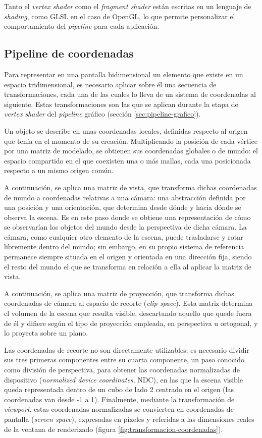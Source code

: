 Tanto el \emph{vertex shader} como el \emph{fragment shader} están escritas en un lenguaje de \emph{shading}, como GLSL en el caso de OpenGL, lo que permite personalizar el comportamiento del \textit{pipeline} para cada aplicación.

\subsection{Pipeline de coordenadas} \label{sec:pipeline-coordenadas}

Para representar en una pantalla bidimensional un elemento que existe en un espacio tridimensional, es necesario aplicar sobre él una secuencia de transformaciones, cada una de las cuales lo lleva de un sistema de coordenadas al siguiente. Estas transformaciones son las que se aplican durante la etapa de \emph{vertex shader} del \textit{pipeline} gráfico (sección \ref{sec:pipeline-grafico}).

Un objeto se describe en unas coordenadas locales, definidas respecto al origen que tenía en el momento de su creación. Multiplicando la posición de cada vértice por una matriz de modelado, se obtienen sus coordenadas globales o de mundo: el espacio compartido en el que coexisten una o más mallas, cada una posicionada respecto a un mismo origen común.

A continuación, se aplica una matriz de vista, que transforma dichas coordenadas de mundo a coordenadas relativas a una cámara: una abstracción definida por una posición y una orientación, que determina desde dónde y hacia dónde se observa la escena. Es en este paso donde se obtiene una representación de cómo se observarían los objetos del mundo desde la perspectiva de dicha cámara. La cámara, como cualquier otro elemento de la escena, puede trasladarse y rotar libremente dentro del mundo; sin embargo, en su propio sistema de referencia permanece siempre situada en el origen y orientada en una dirección fija, siendo el resto del mundo el que se transforma en relación a ella al aplicar la matriz de vista.

A continuación, se aplica una matriz de proyección, que transforma dichas coordenadas de cámara al espacio de recorte (\emph{clip space}). Esta matriz determina el volumen de la escena que resulta visible, descartando aquello que quede fuera de él y difiere según el tipo de proyección empleada, en perspectiva u ortogonal, y lo proyecta sobre un plano.

Las coordenadas de recorte no son directamente utilizables: es necesario dividir sus tres primeras componentes entre su cuarta componente, un paso conocido como división de perspectiva, para obtener las coordenadas normalizadas de dispositivo (\emph{normalized device coordinates}, NDC), en las que la escena visible queda representada dentro de un cubo de lado 2 centrado en el origen (las coordenadas van desde -1 a 1). Finalmente, mediante la transformación de \emph{viewport}, estas coordenadas normalizadas se convierten en coordenadas de pantalla (\emph{screen space}), expresadas en píxeles y referidas a las dimensiones reales de la ventana de renderizado (figura \ref{fig:transformacion-coordenadas}).

